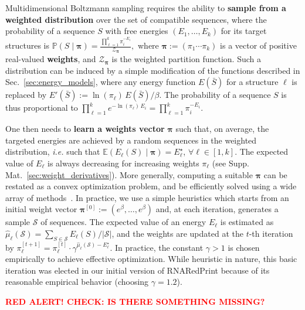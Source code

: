 \documentclass{bioinfo}
\newcommand{\val}{\bar S} %
\newcommand{\partfun}[1]{\mathcal{Z}_{#1}}
\newcommand{\Def}[1]{{\bfseries #1}}
\newcommand{\TargetE}{E^{\star}}
\newcommand{\Software}[1]{{\ttfamily #1}}
\newcommand{\ourprog}{\Software{RNARedPrint}}
\begin{document}
Multidimensional Boltzmann sampling requires the ability to \Def{sample from a weighted distribution} over the set of compatible sequences, where the probability of a sequence $S$ with free energies $(E_1,\ldots,E_k)$ for its target structures is
$\mathbb{P}(S\mid \pmb{\pi}) = \frac{\prod_{\ell=1}^{k} \pi_i^{-E_i}}{\partfun{\pmb{\pi}}},$
where $\pmb{\pi}:=(\pi_1\cdots\pi_k)$ is a vector of positive real-valued \Def{weights}, and $\partfun{\pmb{\pi}}$ is the weighted partition function. Such a distribution can be induced by a simple modification of the functions described in Sec.~\ref{sec:energy_models}, where any energy function $E(\val)$ for a structure $\ell$ is replaced by $E'(\val):= \ln(\pi_\ell)\, E(\val)/\beta$. The probability of a sequence $S$ is thus proportional to
$ \prod_{\ell=1}^{k} e^{-\ln(\pi_\ell)\, E_i} = \prod_{\ell=1}^{k} \pi_i^{-E_i}. $

One then needs to \Def{learn a weights vector} $\pmb{\pi}$ such that, on average, the targeted energies are achieved by a random sequences in the weighted distribution, \emph{i.e.} such that  $\mathbb{E}(E_\ell(S)\mid \pmb{\pi})=\TargetE_\ell$,  $\forall\ell\in[1,k]$.
The expected value of $E_\ell$ is always decreasing for increasing weights $\pi_\ell$ (see Supp. Mat.~\ref{sec:weight_derivatives}). More generally, computing a suitable $\pmb{\pi}$ can be restated as a convex optimization problem, and be efficiently solved using a wide array of methods~\citep{Denise2010,Bendkowski2017}.
In practice, we use a simple heuristics which starts from an initial weight vector $\pmb{\pi}^{[0]}:=(e^\beta,\dots,e^\beta)$ and, at each iteration, generates a sample $\mathcal{S}$ of sequences. The expected value of an energy $E_\ell$ is estimated as $\hat\mu_\ell(\mathcal{S}) = \sum_{S\in\mathcal{S}}E_\ell(S)/|\mathcal{S}|$, and the weights are updated at the $t$-th iteration by %
$\pi_\ell^{[t+1]} = \pi_\ell^{[t]}\cdot \gamma^{\hat\mu_\ell(\mathcal{S})-\TargetE_\ell}$. In practice, the constant $\gamma>1$ is chosen empirically to achieve effective optimization.
While heuristic in nature, this basic iteration was elected in our initial version of \ourprog{} because of its reasonable empirical behavior (choosing $\gamma=1.2$). 

\textcolor{red}{\bf RED ALERT! CHECK: IS THERE SOMETHING MISSING?}
\end{document}
